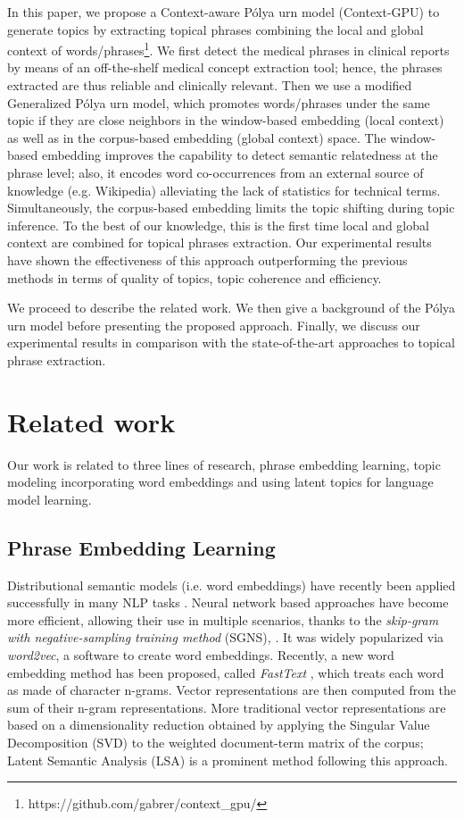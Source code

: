 \documentclass[letterpaper]{article}
\begin{document}
In this paper, we propose a Context-aware P\'{o}lya urn model (Context-GPU) to generate topics by extracting topical phrases combining the local and global context of words/phrases\footnote{https://github.com/gabrer/context\_gpu/}. We first detect the medical phrases in clinical reports by means of an off-the-shelf medical concept extraction tool; hence, the phrases extracted are thus reliable and clinically relevant. Then we use a modified Generalized P\'{o}lya urn model, which promotes words/phrases under the same topic if they are close neighbors in the window-based embedding (local context) as well as in the corpus-based embedding (global context) space. The window-based embedding improves the capability to detect semantic relatedness at the phrase level; also, it encodes word co-occurrences from an external source of knowledge (e.g. Wikipedia) alleviating the lack of statistics for technical terms. Simultaneously, the corpus-based embedding limits the topic shifting during topic inference. To the best of our knowledge, this is the first time local and global context are combined for topical phrases extraction. Our experimental results have shown the effectiveness of this approach outperforming the previous methods in terms of quality of topics, topic coherence and efficiency.

We proceed to describe the related work. We then give a background of the P\'{o}lya urn model before presenting the proposed approach. Finally, we discuss our experimental results in comparison with the state-of-the-art approaches to topical phrase extraction.


\section{Related work}

Our work is related to three lines of research, phrase embedding learning, topic modeling incorporating word embeddings and using latent topics for language model learning.

\subsection{Phrase Embedding Learning}

Distributional semantic models (i.e. word embeddings) have recently been applied successfully in many NLP tasks \cite{Levy15}. Neural network based approaches have become more efficient, allowing their use in multiple scenarios, thanks to the \textit{skip-gram with negative-sampling training method} (SGNS), \cite{Mikolov13a,Mikolov13b}. It was widely popularized via \textit{word2vec}, a software to create word embeddings. Recently, a new word embedding method has been proposed, called \textit{FastText} \cite{Joulin16}, which treats each word as made of character n-grams. Vector representations are then computed from the sum of their n-gram representations.
More traditional vector representations are based on a dimensionality reduction obtained by applying the Singular Value Decomposition (SVD) to the weighted document-term matrix of the corpus; Latent Semantic Analysis (LSA) \cite{Deerwester90} is a prominent method following this approach.
\end{document}
